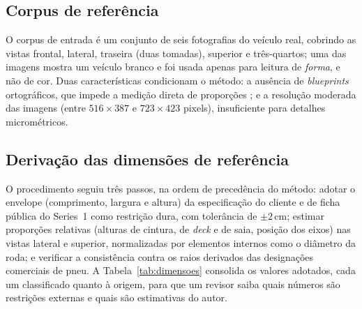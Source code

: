 \subsection{Corpus de refer\^encia}

O corpus de entrada \'e um conjunto de seis fotografias do ve\'iculo real, cobrindo as
vistas frontal, lateral, traseira (duas tomadas), superior e tr\^es-quartos; uma das
imagens mostra um ve\'iculo branco e foi usada apenas para leitura de \emph{forma}, e
n\~ao de cor. Duas caracter\'isticas condicionam o m\'etodo: a aus\^encia de
\emph{blueprints} ortogr\'aficos, que impede a medi\c{c}\~ao direta de
propor\c{c}\~oes \cite{hartley2004}; e a resolu\c{c}\~ao moderada das imagens (entre
$516\times387$ e $723\times423$ pixels), insuficiente para detalhes microm\'etricos.

\subsection{Deriva\c{c}\~ao das dimens\~oes de refer\^encia}

O procedimento seguiu tr\^es passos, na ordem de preced\^encia do m\'etodo: adotar o
envelope (comprimento, largura e altura) da especifica\c{c}\~ao do cliente e de ficha
p\'ublica do Series~1 como restri\c{c}\~ao dura, com toler\^ancia de $\pm2$\,cm;
estimar propor\c{c}\~oes relativas (alturas de cintura, de \emph{deck} e de saia,
posi\c{c}\~ao dos eixos) nas vistas lateral e superior, normalizadas por elementos
internos como o di\^ametro da roda; e verificar a consist\^encia contra os raios
derivados das designa\c{c}\~oes comerciais de pneu. A Tabela~\ref{tab:dimensoes}
consolida os valores adotados, cada um classificado quanto \`a origem, para que um
revisor saiba quais n\'umeros s\~ao restri\c{c}\~oes externas e quais s\~ao
estimativas do autor.

